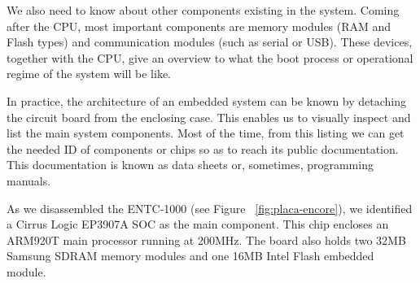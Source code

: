 \documentclass[conference]{IEEEtran}
\newcommand{\nota}[1]{}
\begin{document}
We also need to know about other components existing in the system. Coming after the CPU, most important components are memory modules (RAM and Flash types) and communication modules (such as serial or USB). These devices, together with the CPU, give an overview to what the boot process or operational regime of the system will be like.

\nota {En la práctica, la arquitectura de un sistema embebido particular puede conocerse desmontando
la placa del circuito impreso de la caja exterior. Esto posibilita
inspeccionar visualmente y listar todos los componentes principales con los
que está compuesto el sistema. A partir de este listado, puede
obtenerse, en la mayoría de los casos, la documentación pública
de cada uno de los componentes o chips listados.
A este tipo de documentación se conoce como hoja de datos, o
en algunos casos (como el de las memorias o CPU) manuales de programación
del chip.}

In practice, the architecture of an embedded system can be known by detaching the circuit board from the enclosing case. This enables us to visually inspect and list the main system components. Most of the time, from this listing we can get the needed ID of components or chips so as to reach its public documentation. This documentation is known as data sheets or, sometimes, programming manuals.


\nota { 
En nuestro caso de estudio, al desmontar el ENTC-1000 (ver la Figura ~\ref{fig:placa-encore} )
, identificamos
un SOC Cirrus Logic EP3907A como el componente principal,
que contiene un procesador central de arquitectura ARM, modelo ARM920T
a una velocidad de 200Mhz.
Además, la placa presenta dos módulos de memoria SDRAM Samsung de 32MB cada uno, y un modulo
de memoria Flash embebida INTEL de 16MB.
}

As we disassembled the ENTC-1000 (see Figure ~\ref{fig:placa-encore}), we identified a Cirrus Logic EP3907A SOC as the main component. This chip encloses an ARM920T main processor running at 200MHz. The board also holds two 32MB Samsung SDRAM memory modules and one 16MB Intel Flash embedded module.
\end{document}

